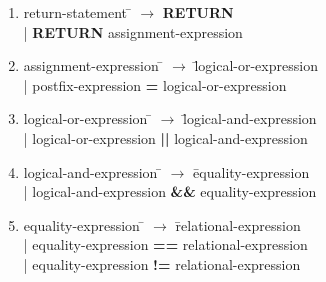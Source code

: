 \begin{enumerate}
\item \begin{tabbing} return-statement \= $\rightarrow$ \= \textbf{RETURN} \\
	\> \hspace*{0.05cm} | \> \textbf{RETURN} assignment-expression \\
\end{tabbing}

\item \begin{tabbing} assignment-expression \= $\rightarrow$ \= logical-or-expression \\
	\> \hspace*{0.05cm} | \> postfix-expression \textbf{=} logical-or-expression \\
\end{tabbing}

\item \begin{tabbing} logical-or-expression \= $\rightarrow$ \= logical-and-expression \\
	\> \hspace*{0.05cm} | \> logical-or-expression \textbf{||} logical-and-expression \\
\end{tabbing}

\item \begin{tabbing} logical-and-expression \= $\rightarrow$ \= equality-expression \\
	\> \hspace*{0.05cm} | \> logical-and-expression \textbf{\&\&} equality-expression \\
\end{tabbing}

\item \begin{tabbing} equality-expression \= $\rightarrow$ \= relational-expression \\
	\> \hspace*{0.05cm} | \> equality-expression \textbf{==} relational-expression \\
	\> \hspace*{0.05cm} | \> equality-expression \textbf{!=} relational-expression \\
\end{tabbing}


\end{enumerate}
